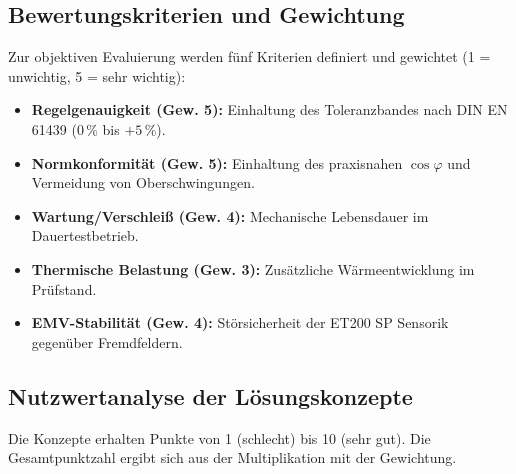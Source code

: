 \subsection{Bewertungskriterien und Gewichtung}
\label{sec:bewertungskriterien}

Zur objektiven Evaluierung werden fünf Kriterien definiert und gewichtet (1 = unwichtig, 5 = sehr wichtig):
\begin{itemize}
    \item \textbf{Regelgenauigkeit (Gew. 5):} Einhaltung des Toleranzbandes nach DIN EN 61439 ($0\,\%$ bis $+5\,\%$).
    \item \textbf{Normkonformität (Gew. 5):} Einhaltung des praxisnahen $\cos\varphi$ und Vermeidung von Oberschwingungen.
    \item \textbf{Wartung/Verschleiß (Gew. 4):} Mechanische Lebensdauer im Dauertestbetrieb.
    \item \textbf{Thermische Belastung (Gew. 3):} Zusätzliche Wärmeentwicklung im Prüfstand.
    \item \textbf{EMV-Stabilität (Gew. 4):} Störsicherheit der ET200 SP Sensorik gegenüber Fremdfeldern.
\end{itemize}
\subsection{Nutzwertanalyse der Lösungskonzepte}
\label{sec:nutzwertanalyse}

Die Konzepte erhalten Punkte von 1 (schlecht) bis 10 (sehr gut). Die Gesamtpunktzahl ergibt sich aus der Multiplikation mit der Gewichtung.

